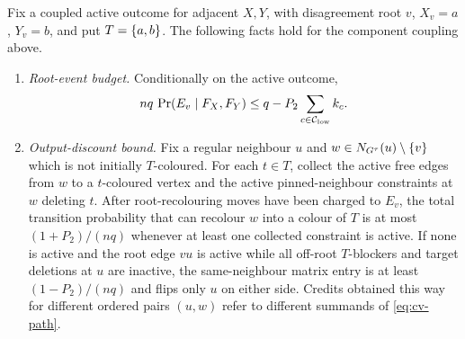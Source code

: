 \begin{lemma}\label{lem:cv-component-budgets}
Fix a coupled active outcome for adjacent $X,Y$, with disagreement root
$v$, $X_v=a$, $Y_v=b$, and put $T=\left\{a,b\right\}$. The following facts hold
for the component coupling above.
\begin{enumerate}
\item \emph{Root-event budget.}
  Conditionally on the active outcome,
  \begin{equation}\label{eq:cv-root-recolour-budget}
    nq\,\Pr(E_v\mid F_X,F_Y)
       \le q-P_2\sum_{c\in\mathcal C_{\rm low}}k_c .
  \end{equation}
\item \emph{Output-discount bound.}
  Fix a regular neighbour $u$ and
  $w\in N_{G^\tau}(u)\setminus\left\{v\right\}$ which is not initially
  $T$-coloured. For each $t\in T$, collect the active free edges from
  $w$ to a $t$-coloured vertex and the active pinned-neighbour constraints at $w$
  deleting $t$. After root-recolouring moves have been charged to
  $E_v$, the total transition probability that can recolour $w$ into a colour
  of $T$ is at most $(1+P_2)/(nq)$ whenever at least one collected constraint is
  active. If none is active and the root edge $vu$ is active while all
  off-root $T$-blockers and target deletions at $u$ are inactive, the
  same-neighbour matrix entry is at least $(1-P_2)/(nq)$ and flips only $u$ on
  either side. Credits obtained this way for different ordered pairs
  $(u,w)$ refer to different summands of \eqref{eq:cv-path}.
\end{enumerate}
\end{lemma}

